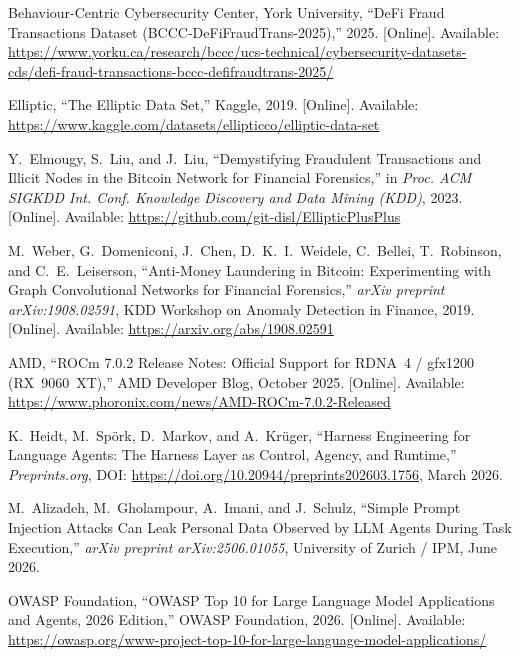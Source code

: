 \documentclass[12pt,a4paper]{report}
\begin{document}
{\begin{enumerate}[label={[\arabic*]}]
\item Behaviour-Centric Cybersecurity Center, York University, ``DeFi Fraud Transactions Dataset (BCCC-DeFiFraudTrans-2025),'' 2025. [Online]. Available: \url{https://www.yorku.ca/research/bccc/ucs-technical/cybersecurity-datasets-cds/defi-fraud-transactions-bccc-defifraudtrans-2025/}

\item Elliptic, ``The Elliptic Data Set,'' Kaggle, 2019. [Online]. Available: \url{https://www.kaggle.com/datasets/ellipticco/elliptic-data-set}

\item Y.~Elmougy, S.~Liu, and J.~Liu, ``Demystifying Fraudulent Transactions and Illicit Nodes in the Bitcoin Network for Financial Forensics,'' in \textit{Proc. ACM SIGKDD Int. Conf. Knowledge Discovery and Data Mining (KDD)}, 2023. [Online]. Available: \url{https://github.com/git-disl/EllipticPlusPlus}

\item M.~Weber, G.~Domeniconi, J.~Chen, D.~K.~I.~Weidele, C.~Bellei, T.~Robinson, and C.~E.~Leiserson, ``Anti-Money Laundering in Bitcoin: Experimenting with Graph Convolutional Networks for Financial Forensics,'' \textit{arXiv preprint arXiv:1908.02591}, KDD Workshop on Anomaly Detection in Finance, 2019. [Online]. Available: \url{https://arxiv.org/abs/1908.02591}

\item AMD, ``ROCm 7.0.2 Release Notes: Official Support for RDNA~4 / gfx1200 (RX~9060~XT),'' AMD Developer Blog, October 2025. [Online]. Available: \url{https://www.phoronix.com/news/AMD-ROCm-7.0.2-Released}


\item K.~Heidt, M.~Sp\"{o}rk, D.~Markov, and A.~Kr\"{u}ger, ``Harness Engineering
for Language Agents: The Harness Layer as Control, Agency, and Runtime,''
\textit{Preprints.org}, DOI: \url{https://doi.org/10.20944/preprints202603.1756},
March 2026.

\item M.~Alizadeh, M.~Gholampour, A.~Imani, and J.~Schulz, ``Simple Prompt
Injection Attacks Can Leak Personal Data Observed by LLM Agents During Task
Execution,'' \textit{arXiv preprint arXiv:2506.01055}, University of Zurich / IPM,
June 2026.

\item OWASP Foundation, ``OWASP Top 10 for Large Language Model Applications and
Agents, 2026 Edition,'' OWASP Foundation, 2026. [Online]. Available:
\url{https://owasp.org/www-project-top-10-for-large-language-model-applications/}


\end{enumerate}}
\end{document}
